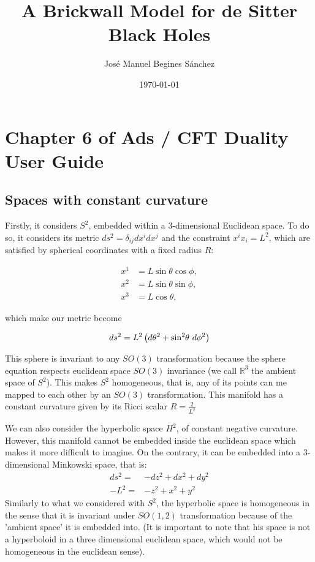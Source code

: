 \documentclass[12pt]{article}
\title{A Brickwall Model for de Sitter Black Holes}
\author{José Manuel Begines Sánchez}
\date{\today}
\begin{document}
\maketitle

\section{Chapter 6 of Ads / CFT Duality User Guide}

\subsection{Spaces with constant curvature}

Firstly, it considers \( S^2 \), embedded within a 3-dimensional Euclidean space. To do so, it considers its metric \( ds^2 = \delta_{ij} dx^i dx^j \) and the constraint \( x^i x_i = L^2 \), which are satisfied by spherical coordinates with a fixed radius \( R \):

\begin{equation}
\begin{aligned}
    x^1 &= L \sin{ \theta } \cos{ \phi }, \\
    x^2 &= L \sin{ \theta } \sin{ \phi }, \\
    x^3 &= L \cos{ \theta },
\end{aligned}
\end{equation}

which make our metric become

\begin{equation}
    ds^2 = L^2 \left( d\theta^2 + \sin^2{ \hspace{-2pt}\theta } ~ d\phi^2 \right)
\end{equation}

This sphere is invariant to any \( SO(3) \) transformation because the sphere equation respects euclidean space \( SO(3) \) invariance (we call \(\mathbb{R}^3\) the ambient space of \( S^2 \)). This makes \( S^2 \) homogeneous, that is, any of its points can me mapped to each other by an \( SO(3) \) transformation. This manifold has a constant curvature given by its Ricci scalar \( R = \frac{2}{L^2} \)

\vspace{0.5cm}

We can also consider the hyperbolic space \( H^2 \), of constant negative curvature. However, this manifold cannot be embedded inside the euclidean space which makes it more difficult to imagine. On the contrary, it can be embedded into a 3-dimensional Minkowski space, that is:
\begin{align}
    ds^2 = & - dz^2 + dx^2 + dy^2 \\
    -L^2 = & - z^2 + x^2 + y^2
\end{align}
Similarly to what we considered with \( S^2 \), the hyperbolic space is homogeneous in the sense that it is invariant under \( SO(1,2) \) transformation because of the 'ambient space' it is embedded into. (It is important to note that his space is not a hyperboloid in a three dimensional euclidean space, which would not be homogeneous in the euclidean sense).
\end{document}
